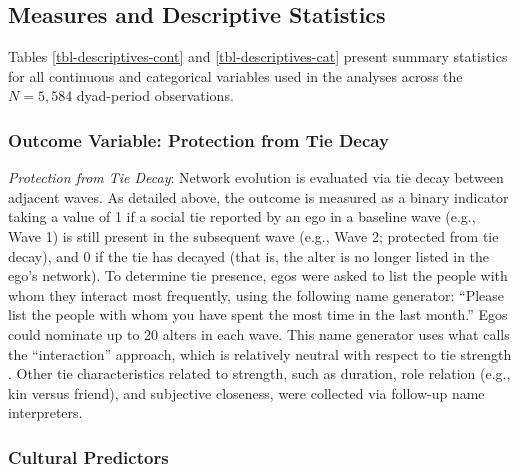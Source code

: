\documentclass[12pt,letterpaper]{article}
\begin{document}
\subsection{Measures and Descriptive Statistics}\label{measures}

Tables \ref{tbl-descriptives-cont} and \ref{tbl-descriptives-cat} present summary statistics for all continuous and categorical variables used in the analyses across the $N = 5,584$ dyad-period observations.





\subsubsection{Outcome Variable: Protection from Tie Decay}
\emph{Protection from Tie Decay}: Network evolution is evaluated via tie decay between adjacent waves. As detailed above, the outcome is measured as a binary indicator taking a value of 1 if a social tie reported by an ego in a baseline wave (e.g., Wave 1) is still present in the subsequent wave (e.g., Wave 2; protected from tie decay), and 0 if the tie has decayed (that is, the alter is no longer listed in the ego's network). To determine tie presence, egos were asked to list the people with whom they interact most frequently, using the following name generator: ``Please list the people with whom you have spent the most time in the last month.'' Egos could nominate up to 20 alters in each wave. This name generator uses what \citep{marin2007simplifying-74e} calls the ``interaction'' approach, which is relatively neutral with respect to tie strength \citep{laumann1989boundary-0af,  marsden1984measuring-f62}. Other tie characteristics related to strength, such as duration, role relation (e.g., kin versus friend), and subjective closeness, were collected via follow-up name interpreters. 

\subsubsection{Cultural Predictors} 
\end{document}
